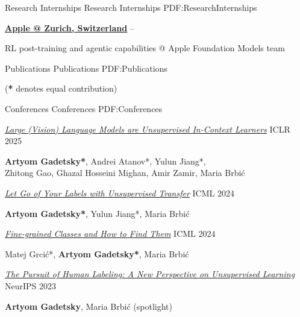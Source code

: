 \documentclass[letterpaper,MMMyyyy,nonstopmode]{simpleresumecv}
\begin{document}
\begin{Body}

\Section
{Research Internships}
{Research Internships}
{PDF:ResearchInternships}

\Entry
\href{http://apple.com}
{\textbf{Apple @ Zurich, Switzerland}}
\hfill {} --
\begin{Detail}
RL post-training and agentic capabilities @ Apple Foundation Models team
\end{Detail}
\Gap



\Section
{Publications}
{Publications}
{PDF:Publications}

\Entry
\hfill
(\textbf{*} denotes equal contribution)

\SubSection
{Conferences}
{Conferences}
{PDF:Conferences}
\Gap

\Entry
\href{https://openreview.net/forum?id=ohJxgRLlLt}{\textit{Large (Vision) Language Models are Unsupervised In-Context Learners}}
\hfill ICLR 2025
\begin{Detail}
\textbf{Artyom Gadetsky*}, Andrei Atanov*, Yulun Jiang*,\\ Zhitong Gao, Ghazal Hosseini Mighan, Amir Zamir, Maria Brbić
\end{Detail}
\Gap

\Entry
\href{https://proceedings.mlr.press/v235/gadetsky24a.html}{\textit{Let Go of Your Labels with Unsupervised Transfer}} \hfill ICML 2024
\begin{Detail}
\textbf{Artyom Gadetsky*}, Yulun Jiang*, Maria Brbić
\end{Detail}
\Gap

\Entry
\href{https://proceedings.mlr.press/v235/grcic24a.html}{\textit{Fine-grained Classes and How to Find Them}} \hfill ICML 2024
\begin{Detail}
Matej Grcić*, \textbf{Artyom Gadetsky*}, Maria Brbić
\end{Detail}
\Gap

\Entry
\href{https://proceedings.neurips.cc/paper_files/paper/2023/hash/be38c74290c251820e396680a82ce12d-Abstract-Conference.html}{\textit{The Pursuit of Human Labeling: A New Perspective on Unsupervised Learning}} \hfill NeurIPS 2023
\begin{Detail}
\textbf{Artyom Gadetsky}, Maria Brbić \hfill(spotlight)
\end{Detail}
\Gap


\end{Body}
\end{document}
